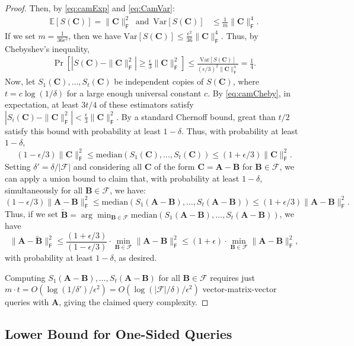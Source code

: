 \documentclass{article}[11pt]
\theoremstyle{definition}
\newcommand{\E}{\mathbb{E}}
\newcommand{\Var}{\mathrm{Var}}
\newcommand{\bv}[1]{\boldsymbol{\mathbf{#1}}}
\newcommand{\Fro}{\mathsf{F}}
\newcommand{\F}{\mathcal{F}}
\begin{document}
\begin{proof}
        Then, by \eqref{eq:camExp} and \eqref{eq:CamVar}:
        \begin{align*}%
            \E[S(\bv{C})] = \|\bv C\|_\Fro^2\,\text{ and }\,
            \Var[S(\bv{C})] &\leq \frac{1}{m} \|\bv C\|_\Fro^4.
        \end{align*}
        If we set $m = \frac{1}{36 \epsilon^2}$, then we have $\Var[S(\bv{C})] \leq \frac{\epsilon^2}{36} \|\bv C\|_\Fro^4$. Thus, by Chebyshev's inequality, 
        \begin{align}\label{eq:camCheby}
            \Pr[|S(\bv{C}) - \|\bv C\|_\Fro^2| \geq \frac{\epsilon}{3} \|\bv C\|_\Fro^2] \leq \frac{\Var[S(\bv{C})]}{(\epsilon/3)^2 \|\bv C\|_\Fro^4} = \frac{1}{4}.
        \end{align}
        Now, let $S_1(\bv{C}),\ldots,S_t(\bv{C})$ be independent copies of $S(\bv{C})$, where $t = c\log(1/\delta)$ for a large enough universal constant $c$. By \eqref{eq:camCheby}, in expectation, at least $3t/4$ of these estimators satisfy $|S_i(\bv{C}) - \|\bv C\|_\Fro^2| < \frac{\epsilon}{3} \|\bv C\|_\Fro^2$. By a standard Chernoff bound, great than $t/2$ satisfy this bound with probability at least $1-\delta$. Thus, with probability at least $1-\delta$,
        $$(1-\epsilon/3) \|\bv C\|_\Fro^2 \le \mathrm{median}(S_1(\bv{C}),\ldots,S_t(\bv{C})) \le (1+\epsilon/3) \|\bv C\|_\Fro^2.$$
    Setting $\delta' = \delta/|\F|$ and considering all $\bv C$ of the form $\bv C = \bv A - \bv B$ for $\bv B \in \F$, we can apply a union bound to claim that, with probability at least $1-\delta$, simultaneously for all $\bv B \in \F$, we have:
    $$(1-\epsilon/3) \|\bv A - \bv  B\|_\Fro^2 \le \mathrm{median}(S_1(\bv{A}-\bv{B}),\ldots,S_t(\bv{A}-\bv{B})) \le (1+\epsilon/3) \|\bv A - \bv B\|_\Fro^2.$$
    Thus, if we set $\displaystyle \bv{\tilde B} = \arg\min_{\bv B \in \F} \mathrm{median}(S_1(\bv{A}-\bv{B}),\ldots,S_t(\bv{A}-\bv{B}))$, we have $$\|\bv A - \bv{\tilde B}\|_\Fro^2 \leq \frac{(1+\epsilon/3)}{(1-\epsilon/3)} \cdot \min_{\bv B \in \F} \|\bv A - \bv B\|_\Fro^2 \le (1+\epsilon) \cdot \min_{\bv B \in \F} \|\bv A - \bv B\|_\Fro^2,$$ with probability at least $1-\delta$, as desired.

    Computing $S_1(\bv{A}-\bv{B}),\ldots,S_t(\bv{A}-\bv{B})$ for all $\bv{B}\in \mathcal{F}$ requires just $m \cdot t = O(\log(1/\delta')/\epsilon^2) = O(\log(|\F|/\delta)/\epsilon^2)$ vector-matrix-vector queries with $\bv A$, giving the claimed query complexity.
    \end{proof}

\subsection{Lower Bound for One-Sided Queries}
\label{sec:lower_onesided}
\end{document}
